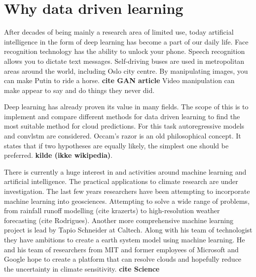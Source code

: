 \section{Why data driven learning} \label{sec:intro_deep_learning}
After decades of being mainly a research area of limited use, today artificial intelligence in the form of deep learning has become a part of our daily life. Face recognition technology has the ability to unlock your phone. Speech recognition allows you to dictate text messages. Self-driving buses are used in metropolitan areas around the world, including Oslo city centre. By manipulating images, you can make Putin to ride a horse. \textbf{cite GAN article} Video manipulation can make appear to say and do things they never did. 

Deep learning has already proven its value in many fields. The scope of this is to implement and compare different methods for data driven learning to find the most suitable method for cloud predictions. For this task autoregressive models and \acrfull{convlstm} are considered. 
Occam's razor is an old philosophical concept. It states that if two hypotheses are equally likely, the simplest one should be preferred. \textbf{kilde (ikke wikipedia)}.

There is currently a huge interest in and activities around machine learning and artificial intelligence.
The practical applications to climate research are under investigation. The last few years researchers have been attempting to incorporate machine learning into geosciences. Attempting to solve a wide range of problems, from rainfall runoff modelling (cite krazerts) to  high-resolution weather forecasting (cite Rodrigues).
Another more comprehensive machine learning project is lead by Tapio Schneider at Caltech. Along with his team of technologist they have ambitions to create a earth system model using machine learning. He and his team of researchers from MIT and former employees of Microsoft and Google hope to create a platform that can resolve clouds and hopefully reduce the uncertainty in climate sensitivity. \textbf{cite Science} 

